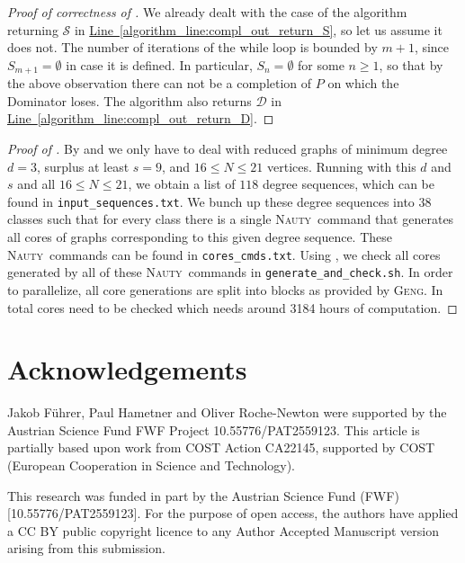 \documentclass[a4paper,11pt,oneside]{scrartcl}
\theoremstyle{definition}
\theoremstyle{remark}
\newcommand{\nauty}{\textsc{Nauty}}
\newcommand{\geng}{\textsc{Geng}}
\newcommand{\lineref}[1]{\hyperref[#1]{Line~\ref{#1}}}
\begin{document}
\begin{proof}[Proof of correctness of ]
    We already dealt with the case of the algorithm returning $\mathcal S$ in \lineref{algorithm_line:compl_out_return_S}, so let us assume it does not. The number of iterations of the while loop is bounded by $m+1$, since $S_{m+1} = \emptyset$ in case it is defined. In particular, $S_n = \emptyset$ for some $n \geq 1$, so that by the above observation there can not be a completion of $P$ on which the Dominator loses. The algorithm also returns $\mathcal D$ in \lineref{algorithm_line:compl_out_return_D}.
\end{proof}

\begin{proof}[Proof of ] 
    By  and  we only have to deal with reduced graphs of minimum degree $d=3$, surplus at least $s=9$, and $16 \leq N \leq 21$ vertices.
    Running  with this $d$ and $s$ and all $16 \leq N \leq 21$, we obtain a list of $118$ degree sequences, which can be found in \texttt{input\_sequences.txt}.
    We bunch up these degree sequences into $38$ classes such that for every class there is a single \nauty\ command that generates all cores of graphs corresponding to this given degree sequence. These \nauty\ commands can be found in \texttt{cores\_cmds.txt}.
    Using , we check all cores generated by all of these \nauty\ commands in \texttt{generate\_and\_check.sh}.
    In order to parallelize, all core generations are split into blocks as provided by \geng. In total  cores need to be checked which needs around 3184 hours of computation.
\end{proof}



\section*{Acknowledgements} Jakob Führer, Paul Hametner and Oliver Roche-Newton were supported by the Austrian Science Fund FWF Project 10.55776/PAT2559123.
This article is partially based upon work from COST Action CA22145, supported by COST (European Cooperation in Science and Technology).

This research was funded in part by the Austrian Science Fund (FWF) [10.55776/PAT2559123]. For the purpose of open access, the authors have applied a CC BY public copyright licence to any Author Accepted Manuscript version arising from this submission.
\end{document}
